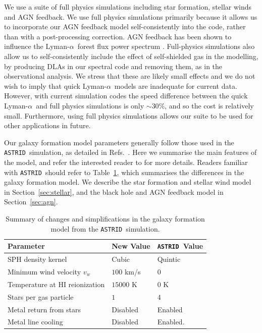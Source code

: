 \documentclass[a4paper,11pt]{article}
\newcommand{\Lya}{Lyman-$\alpha$}
\newcommand{\astrid}{\texttt{ASTRID}}
\begin{document}
We use a suite of full physics simulations including star formation, stellar winds and AGN feedback. We use full physics simulations primarily because it allows us to incorporate our AGN feedback model self-consistently into the code, rather than with a post-processing correction. AGN feedback has been shown to influence the \Lya~forest flux power spectrum \cite{Viel:2013, Chabanier:2020}. Full-physics simulations also allow us to self-consistently include the effect of self-shielded gas in the modelling, by producing DLAs in our spectral code and removing them, as in the observational analysis. We stress that these are likely small effects and we do not wish to imply that quick \Lya~models are inadequate for current data. However, with current simulation codes the speed difference between the quick \Lya~and full physics simulations is only $\sim 30\%$, and so the cost is relatively small. Furthermore, using full physics simulations allows our suite to be used for other applications in future.

Our galaxy formation model parameters generally follow those used in the \astrid~simulation, as detailed in Refs.~\cite{Bird:2022, Ni:2021}. Here we summarise the main features of the model, and refer the interested reader to \cite{Bird:2022} for more details. Readers familiar with \astrid~should refer to Table~\ref{tab:paramchanges}, which summarises the differences in the galaxy formation model. We describe the star formation and stellar wind model in Section~\ref{sec:stellar}, and the black hole and AGN feedback model in Section~\ref{sec:agn}.

\begin{table}
\begin{centering}
  \begin{tabular}{lll}
  \hline
  Parameter & New Value & \astrid~Value \\
    \hline
SPH density kernel  & Cubic & Quintic \\
Minimum wind velocity $v_w$ & $100$ km/s & $0$ \\
Temperature at HI reionization & $15000$ K & $0$ K \\
Stars per gas particle & $1$ & $4$ \\
Metal return from stars & Disabled & Enabled\\
Metal line cooling & Disabled & Enabled. \\
    \hline
  \end{tabular}
  \caption{Summary of changes and simplifications in the galaxy formation model from the \astrid~simulation.}
  \label{tab:paramchanges}
  \end{centering}
\end{table}
\end{document}
